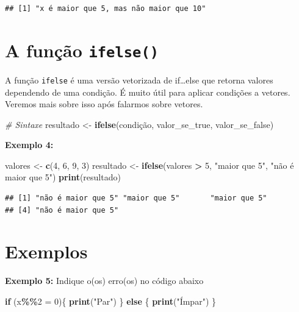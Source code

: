 \documentclass[
]{book}
\newenvironment{Shaded}{\begin{snugshade}}{\end{snugshade}}
\newcommand{\CommentTok}[1]{\textcolor[rgb]{0.56,0.35,0.01}{\textit{#1}}}
\newcommand{\ControlFlowTok}[1]{\textcolor[rgb]{0.13,0.29,0.53}{\textbf{#1}}}
\newcommand{\DecValTok}[1]{\textcolor[rgb]{0.00,0.00,0.81}{#1}}
\newcommand{\FunctionTok}[1]{\textcolor[rgb]{0.13,0.29,0.53}{\textbf{#1}}}
\newcommand{\NormalTok}[1]{#1}
\newcommand{\OtherTok}[1]{\textcolor[rgb]{0.56,0.35,0.01}{#1}}
\newcommand{\SpecialCharTok}[1]{\textcolor[rgb]{0.81,0.36,0.00}{\textbf{#1}}}
\newcommand{\StringTok}[1]{\textcolor[rgb]{0.31,0.60,0.02}{#1}}
\begin{document}
\begin{verbatim}
## [1] "x é maior que 5, mas não maior que 10"
\end{verbatim}

\section{\texorpdfstring{A função \texttt{ifelse()}}{A função ifelse()}}\label{a-funuxe7uxe3o-ifelse}

A função \texttt{ifelse} é uma versão vetorizada de if\ldots else que retorna valores dependendo de uma condição. É muito útil para aplicar condições a vetores. Veremos mais sobre isso após falarmos sobre vetores.

\begin{Shaded}
\begin{Highlighting}[]
\CommentTok{\# Sintaxe}
\NormalTok{resultado }\OtherTok{\textless{}{-}} \FunctionTok{ifelse}\NormalTok{(condição, valor\_se\_true, valor\_se\_false)}
\end{Highlighting}
\end{Shaded}

\textbf{Exemplo 4:}

\begin{Shaded}
\begin{Highlighting}[]
\NormalTok{valores }\OtherTok{\textless{}{-}} \FunctionTok{c}\NormalTok{(}\DecValTok{4}\NormalTok{, }\DecValTok{6}\NormalTok{, }\DecValTok{9}\NormalTok{, }\DecValTok{3}\NormalTok{)}
\NormalTok{resultado }\OtherTok{\textless{}{-}} \FunctionTok{ifelse}\NormalTok{(valores }\SpecialCharTok{\textgreater{}} \DecValTok{5}\NormalTok{, }\StringTok{"maior que 5"}\NormalTok{, }\StringTok{"não é maior que 5"}\NormalTok{)}
\FunctionTok{print}\NormalTok{(resultado)}
\end{Highlighting}
\end{Shaded}

\begin{verbatim}
## [1] "não é maior que 5" "maior que 5"       "maior que 5"      
## [4] "não é maior que 5"
\end{verbatim}

\section{Exemplos}\label{exemplos}

\textbf{Exemplo 5:} Indique o(os) erro(os) no código abaixo

\begin{Shaded}
\begin{Highlighting}[]
\ControlFlowTok{if}\NormalTok{ (x}\SpecialCharTok{\%\%}\DecValTok{2} \OtherTok{=} \DecValTok{0}\NormalTok{)\{  }
      \FunctionTok{print}\NormalTok{(}\StringTok{"Par"}\NormalTok{)}
\NormalTok{\} }\ControlFlowTok{else}\NormalTok{ \{  }
    \FunctionTok{print}\NormalTok{(}\StringTok{"Ímpar"}\NormalTok{)}
\NormalTok{\}}
\end{Highlighting}
\end{Shaded}
\end{document}
